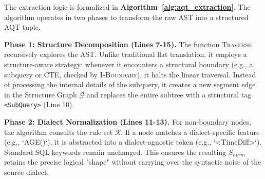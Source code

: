 \documentclass[a4paper,11pt]{article}
\begin{document}
The extraction logic is formalized in \textbf{Algorithm~\ref{alg:aqt_extraction}}. The algorithm operates in two phases to transform the raw AST into a structured AQT tuple.

\textbf{Phase 1: Structure Decomposition (Lines 7-15).}
The function \textsc{Traverse} recursively explores the AST. Unlike traditional flat translation, it employs a structure-aware strategy: whenever it encounters a structural boundary (e.g., a subquery or CTE, checked by \textsc{IsBoundary}), it halts the linear traversal. Instead of processing the internal details of the subquery, it creates a new segment edge in the Structure Graph $\mathcal{G}$ and replaces the entire subtree with a structural tag \texttt{<SubQuery>} (Line 10).

\textbf{Phase 2: Dialect Normalization (Lines 11-13).}
For non-boundary nodes, the algorithm consults the rule set $\mathcal{R}$. If a node matches a dialect-specific feature (e.g., `AGE()`), it is abstracted into a dialect-agnostic token (e.g., `<TimeDiff>`). Standard SQL keywords remain unchanged. This ensures the resulting $S_{norm}$ retains the precise logical "shape" without carrying over the syntactic noise of the source dialect.
\end{document}
